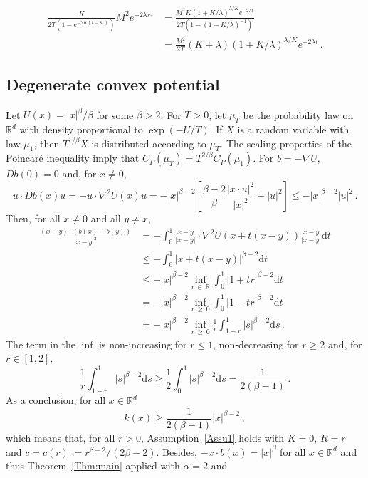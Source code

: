 \documentclass[10pt]{amsart}
\theoremstyle{definition}\newtheorem{defi}[theo]{Definition}\newtheorem{rema}[theo]{Remark}\newtheorem{exam}[theo]{Example}\newtheorem{exem}[theo]{Example}\newtheorem{nota}[theo]{Notation}
\newcommand{\R}{\mathbb R}
\newcommand{\dd}{\mathrm{d}}
\newcommand{\na}{\nabla}
\newcommand{\1}{\mathbbm{1}}
\newcommand{\nv}[1]{#1}
\begin{document}
\begin{align*}
\frac{K}{2T(1-e^{-2K(t-s_*)})} M^2 e^{-2\lambda s_*} &= \frac{M^2 K \left( 1+K/\lambda\right)^{\lambda/K}e^{-2\lambda t} }{2T\left( 1-(1+K/\lambda)^{-1}\right) } \\
&= \frac{M^2}{2T} (K+\lambda) \left( 1+K/\lambda\right)^{\lambda/K}e^{-2\lambda t}\,.
\end{align*}



\subsection{Degenerate convex potential}\label{Sec:convexDegenere}



Let $U(x) = |x|^\beta/\beta$ for some $\beta>2$. For $T>0$, let $\mu_T$ be the probability law on $\R^d$ with density proportional to $\exp(-U/T)$. If $X$ is a random variable with law $\mu_1$, then $T^{1/\beta}X$ is distributed according to $\mu_T$. The scaling properties of the Poincaré inequality \nv{imply} that $C_P(\mu_T)= T^{2/\beta} C_P(\mu_1)$. For $b = -\na U$, $\nv{D b}(0)=0$ and, for $x\neq 0$,
\[
u\cdot \nv{D b}(x) u = -u\cdot \na^2 U(x) u = -|x|^{\beta-2} \left[ \frac{\beta-2}\beta \frac{|x\cdot u|^2}{|x|^2} + |u|^2 \right] \leqslant - |x|^{\beta-2} |u|^2\,.
\]
Then, for all $x\neq 0$ and all $y\neq x$,
\begin{align*}
\frac{(x-y)\cdot \left( b(x)-b(y)\right) }{|x-y|^2} &= -\int_0^1 \frac{x-y}{|x-y|} \cdot \na^2U(x+t(x-y)) \frac{x-y}{|x-y|} \dd t\\
& \leqslant - \int_0^1 |x+t(x-y)|^{\beta-2} \dd t\\
&\leqslant - |x|^{\beta-2} \inf_{\nv{r}\,\in\,\R } \int_0^1 |1+t\nv{r}|^{\beta-2} \dd t\\
& = - |x|^{\beta-2} \inf_{\nv{r}\,\geqslant\,0} \int_0^1 |1-t\nv{r}|^{\beta-2} \dd t\\
& = - |x|^{\beta-2} \inf_{\nv{r}\,\geqslant\,0} \frac1{\nv{r}} \int_{1-\nv{r}}^1 |s|^{\beta-2} \dd s\,.
\end{align*}
The term in the $\inf$ is non-increasing for $\nv{r}\leqslant 1$, non-decreasing for $\nv{r}\geqslant 2$ and, for $\nv{r}\in[1,2]$,
\[
\frac1{\nv{r}}\int_{1-\nv{r}}^1 |s|^{\beta-2} \dd s \geqslant \frac12 \int_0^1 |s|^{\beta-2} \dd s = \frac{1}{2(\beta-1)} \,.
\]
As a conclusion, for all $x\in\R^d$
\[
k(x) \geqslant \frac{1}{2(\beta-1)} |x|^{\beta-2}\,,
\]
which means that, for all $r>0$, Assumption~\ref{Assu1} holds with $K=0$, $R=r$ and $c=c(r):= r^{\beta-2}/(2\beta-2)$. Besides, $-x\cdot b(x) = |x|^\beta $ for all $x\in\R^d$ and thus Theorem~\ref{Thm:main} applied with $\alpha=2$ and
\end{document}
